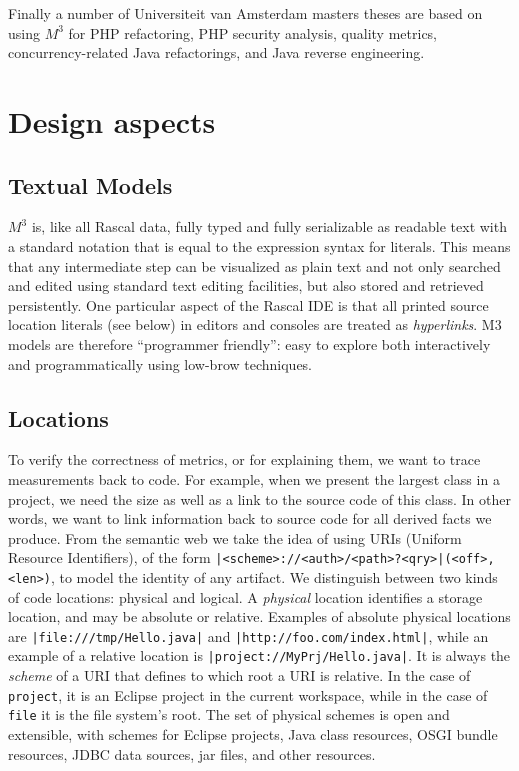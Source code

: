 \documentclass[conference]{IEEEtran}
\newcommand{\loc}[1]{\small{\texttt{#1}}\xspace}
\newcommand{\mthree}{\ensuremath{M^3}\!\xspace}
\begin{document}
Finally a number of Universiteit van Amsterdam masters theses are based on
using \mthree for PHP refactoring, PHP security analysis, quality metrics,
concurrency-related Java refactorings, and Java reverse engineering.

\section{Design aspects}

\subsection{Textual Models}

\mthree is, like all Rascal data, fully typed and fully serializable as
readable text with a standard notation that is equal to the expression syntax
for literals. This means that any intermediate step can be visualized as plain
text and not only searched and edited using standard text editing facilities,
but also stored and retrieved persistently. One particular aspect of the
Rascal IDE is that all printed source location literals (see below) in editors
and consoles are treated as \emph{hyperlinks}. M3 models are therefore
``programmer friendly'': easy to explore both interactively and
programmatically using low-brow techniques.

\subsection{Locations} 

To verify the correctness of metrics, or for explaining them, we want to trace
measurements back to code. For example, when we present the largest class in a
project, we need the size as well as a link to the source code of this class.
In other words, we want to link information back to source code for all
derived facts we produce. From the semantic web we take the idea of using URIs
(Uniform Resource Identifiers), of the form 
\loc{|<scheme>://<auth>/<path>?<qry>|(<off>,<len>)}, 
to model the identity of any artifact. We
distinguish between two kinds of code locations: physical and logical. A
\emph{physical} location identifies a storage location, and may be absolute or
relative. Examples of absolute physical locations are
\loc{|file:///tmp/Hello.java|} and \loc{|http://foo.com/index.html|}, while an
example of a relative location is \loc{|project://MyPrj/Hello.java|}. It is always the
\emph{scheme} of a URI that defines to
which root a URI is relative. In the case of \texttt{project}, it is an
Eclipse project in the current workspace, while in the case of \texttt{file}
it is the file system's root. The set of physical schemes is open and
extensible, with schemes for Eclipse projects, Java class resources, OSGI
bundle resources, JDBC data sources, jar files, and other resources.
\end{document}
